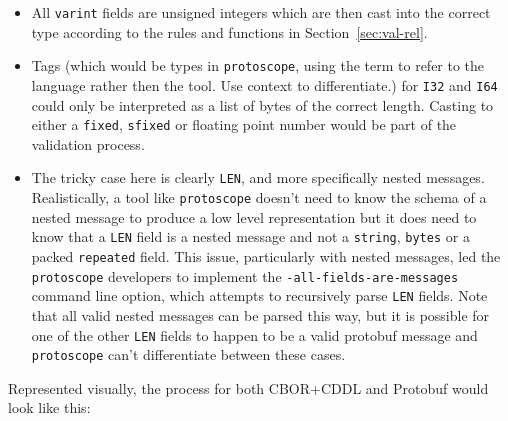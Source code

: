 \documentclass[11pt]{article}
\theoremstyle{definition}
\theoremstyle{plain}
\begin{document}
\begin{itemize}
\item All \texttt{varint} fields are unsigned integers which are then cast into
  the correct type according to the rules and functions in
  Section~\ref{sec:val-rel}.
\item Tags (which would be types in \texttt{protoscope}, using the term to refer
  to the language rather then the tool. Use context to differentiate.) for
  \texttt{I32} and \texttt{I64} could only be interpreted as a list of bytes of
  the correct length. Casting to either a \texttt{fixed}, \texttt{sfixed} or
  floating point number would be part of the validation process.
\item The tricky case here is clearly \texttt{LEN}, and more specifically nested
  messages. Realistically, a tool like \texttt{protoscope} doesn't need to know
  the schema of a nested message to produce a low level representation but it
  does need to know that a \texttt{LEN} field is a nested message and not a
  \texttt{string}, \texttt{bytes} or a packed \texttt{repeated} field. This
  issue, particularly with nested messages, led the \texttt{protoscope}
  developers to implement the \texttt{-all-fields-are-messages} command line
  option, which attempts to recursively parse \texttt{LEN} fields. Note that all
  valid nested messages can be parsed this way, but it is possible for one of
  the other \texttt{LEN} fields to happen to be a valid protobuf message and
  \texttt{protoscope} can't differentiate between these cases.
\end{itemize}

Represented visually, the process for both CBOR+CDDL and Protobuf would look
like this:
\end{document}
